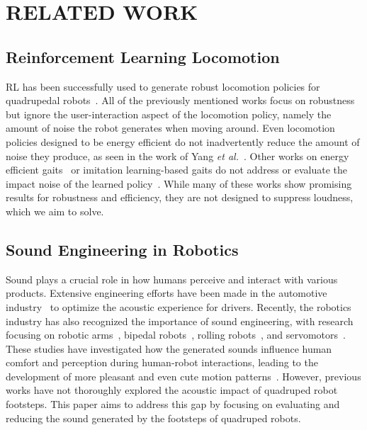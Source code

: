 \section{RELATED WORK}
\subsection{Reinforcement Learning Locomotion}
RL has been successfully used to generate robust locomotion policies for quadrupedal robots~\cite{anymal_terrain, anymal_perceptive, Choi2023-cf, Wu2023-nz}. 
All of the previously mentioned works focus on robustness but ignore the user-interaction aspect of the locomotion policy, namely the amount of noise the robot generates when moving around. 
Even locomotion policies designed to be energy efficient do not inadvertently reduce the amount of noise they produce, as seen in the work of Yang \textit{et al.}~\cite{energyefficient_learning_locomotion}. 
Other works on energy efficient gaits~\cite{energyefficient_amp_locomotion} or imitation learning-based gaits do not address or evaluate the impact noise of the learned policy~\cite{fuchioka2023opt, reske2021imitation}. 
While many of these works show promising results for robustness and efficiency, they are not designed to suppress loudness, which we aim to solve.

\subsection{Sound Engineering in Robotics} Sound plays a crucial role in how humans perceive and interact with various products.
Extensive engineering efforts have been made in the automotive industry~\cite{parizet2008analysis} to optimize the acoustic experience for drivers. Recently, the robotics industry has also recognized the importance of sound engineering, with research focusing on robotic arms~\cite{tennent2017good, trovato2018sound}, bipedal robots~\cite{stelthwalking}, rolling robots~\cite{quietwalkingrobot}, and servomotors~\cite{servo_sound}. These studies have investigated how the generated sounds influence human comfort and perception during human-robot interactions, leading to the development of more pleasant and even cute motion patterns~\cite{arm_motion_sound_study}. 
However, previous works have not thoroughly explored the acoustic impact of quadruped robot footsteps. 
This paper aims to address this gap by focusing on evaluating and reducing the sound generated by the footsteps of quadruped robots. 
